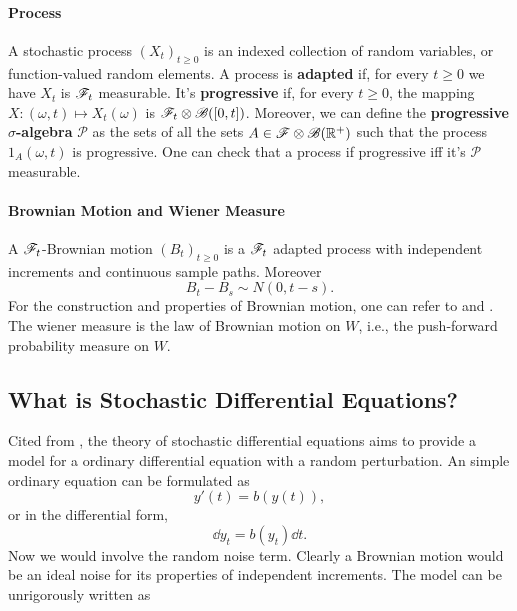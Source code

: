 \documentclass[8pt,onesided]{article}
\begin{document}
\paragraph{Process} A stochastic process $(X_t)_{t\ge 0}$ is an indexed collection of  random variables, or function-valued random elements. A process is \textbf{adapted} if, for every $t\ge 0$ we have $X_t$ is $\mathscr{F}_t$ measurable. It's \textbf{progressive} if, for every $t\ge 0$, the mapping $X: (\omega,t)\mapsto X_t(\omega)$ is $ \mathscr{F}_t\otimes  \mathscr{B}([0,t])$. Moreover, we can define the \textbf{progressive $\sigma$-algebra} $\mathscr{P}$ as the sets of all the sets $A\in\mathscr{F} \otimes \mathscr{B}(\mathbb{R}^+)$ such that the process $1_{A}(\omega,t)$ is progressive. One can check that a process if progressive iff it's $\mathscr{P}$ measurable.

\paragraph{Brownian Motion and Wiener Measure} A $\mathscr{F}_t$-Brownian motion $(B_t)_{t\ge 0}$ is a $\mathscr{F}_t$ adapted process with independent increments and continuous sample paths. Moreover
\begin{equation*}
    B_t-B_s\sim  N(0,t-s).
\end{equation*}
For the construction and properties of Brownian motion, one can refer to \cite{gall2016brownian} and \cite{rogers2000diffusions1}. The wiener measure is the law of Brownian motion on $W$, i.e., the push-forward probability measure on $W$.

\subsection{What is Stochastic Differential Equations?}

Cited from \cite{gall2016brownian}, the theory of stochastic differential equations aims to provide a model for a ordinary differential equation with a random perturbation. An simple ordinary equation can be formulated as
\begin{equation*}
    y'(t)=b(y(t)),
\end{equation*}
or in the differential form,
\begin{equation*}
    \dd y_t=b(y_t) \dd t.
\end{equation*}
Now we would involve the random noise term. Clearly a Brownian motion would be an ideal noise for its properties of independent increments. The model can be unrigorously written as
\end{document}
